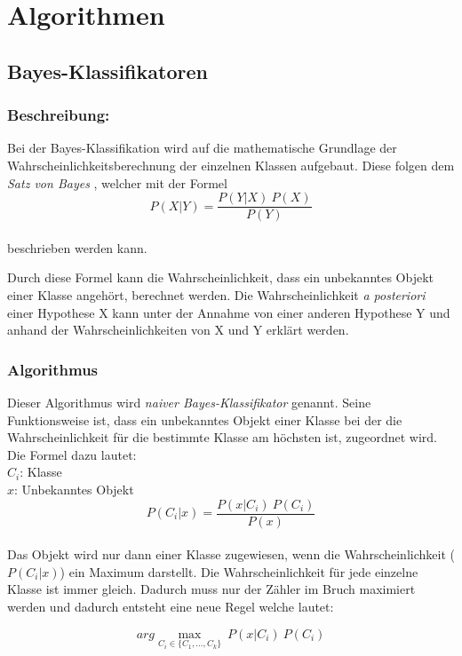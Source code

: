 \section{Algorithmen}
\subsection{Bayes-Klassifikatoren}
\subsubsection{Beschreibung:}
Bei der Bayes-Klassifikation wird auf die mathematische Grundlage der Wahrscheinlichkeitsberechnung der einzelnen Klassen aufgebaut. Diese folgen dem \textit{Satz von Bayes} , welcher mit der Formel \[P(X|Y) = \frac{P(Y|X)\ P(X)}{P(Y)}\]\\ beschrieben werden kann. 

Durch diese Formel kann die Wahrscheinlichkeit, dass ein unbekanntes Objekt einer Klasse angehört, berechnet werden. Die Wahrscheinlichkeit \textit{a posteriori} einer Hypothese X kann unter der Annahme von einer anderen Hypothese Y und anhand der Wahrscheinlichkeiten von X und Y erklärt werden. \cite{brei84,mitch97}

\subsubsection{Algorithmus}
Dieser Algorithmus wird \textit{naiver Bayes-Klassifikator} genannt. Seine Funktionsweise ist, dass ein unbekanntes Objekt einer Klasse bei der die Wahrscheinlichkeit für die bestimmte Klasse am höchsten ist, zugeordnet wird. Die Formel dazu lautet: \\

\(C_i\): Klasse\\

\(x\): Unbekanntes Objekt\\

\[P(C_i|x) = \frac{P(x|C_i)\ P(C_i)}{P(x)}\]\\

Das Objekt wird nur dann einer Klasse zugewiesen, wenn die Wahrscheinlichkeit (\(P(C_i|x)\)) ein Maximum darstellt. Die Wahrscheinlichkeit für jede einzelne Klasse ist immer gleich. Dadurch muss nur der Zähler im Bruch maximiert werden und dadurch entsteht eine neue Regel welche lautet:

\[arg\max\limits_{C_i \in \{C_1,\dotsc,C_k \}}\ P(x|C_i)\ P(C_i) \]\\

